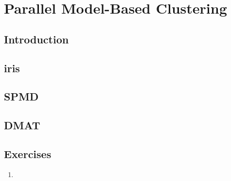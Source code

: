 
\chapter{Parallel Model-Based Clustering}
\label{chp:pmclust}

\section{Introduction}


\section{iris}


\section{SPMD}


\section{DMAT}




\section{Exercises}
\label{sec:pmclust_exercise}

\begin{enumerate}[label=\thechapter-\arabic*]
\item

\end{enumerate}

